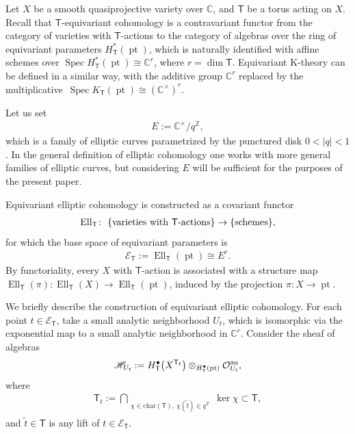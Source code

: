 \documentclass[pdftex]{sigma}
\DeclareMathOperator\pt{pt}
\def\Z{{\mathbb Z}}
\def\C{{\mathbb C}}
\newcommand{\bT}{\mathsf{T}}
\def\Oc{{\mathcal O}}
\newcommand{\sE}{\mathscr{E}}
\newcommand{\cE}{\mathscr{E}}
\newcommand{\Spec}{\operatorname{Spec}}
\newcommand{\Ell}{\operatorname{Ell}}
\numberwithin{equation}{section}
\begin{document}
Let $X$ be a smooth quasiprojective variety over $\C$, and $\bT$ be a torus acting on $X$. Recall that $\bT$-equivariant cohomology is a contravariant functor from the category of varieties with $\bT$-actions to the category of algebras over the ring of equivariant parameters $H^*_\bT (\pt)$, which is naturally identified with affine schemes over $\Spec H^*_\bT (\pt) \cong \C^r$, where $r = \dim \bT$. Equivariant K-theory can be defined in a similar way, with the additive group $\C^r$ replaced by the multiplicative~$\Spec K_\bT (\pt) \cong (\C^{\times})^r$.

Let us set
\begin{gather*}
E := \C^{\times} / q^{\Z},
\end{gather*}
which is a family of elliptic curves parametrized by the punctured disk $0<|q|<1$. In the general definition of elliptic cohomology one works with more general families of elliptic curves, but considering $E$ will be sufficient for the purposes of the present paper.

Equivariant elliptic cohomology is constructed as a covariant functor
\begin{gather*}
\Ell_\bT\colon \ \{ \text{varieties with $\bT$-actions} \} \rightarrow \{ {\rm schemes}\},
\end{gather*}
for which the base space of equivariant parameters is
\begin{gather*}
\sE_\bT := \Ell_\bT (\pt) \cong E^r.
\end{gather*}
By functoriality, every $X$ with $\bT$-action is associated with a structure map $ \Ell_\bT(\pi)\colon \Ell_\bT (X) \to \Ell_\bT(\pt)$, induced by the projection $\pi\colon X \to \pt$.

We briefly describe the construction of equivariant elliptic cohomology. For each point $t\in \sE_\bT$, take a small analytic neighborhood $U_t$, which is isomorphic via the exponential map to a small analytic neighborhood in $\C^r$. Consider the sheaf of algebras
\begin{gather*}
\mathscr{H}_{U_t} := H^\bullet_\bT \big(X^{\bT_t}\big) \otimes_{H^\bullet_\bT (\pt)} \Oc^{{\rm an}}_{U_t},
\end{gather*}
where
\begin{gather*}
\bT_t := \bigcap_{\substack{\chi \in \mathrm{char} (\bT),\, \chi(\tilde t) \in q^{\Z} }} \ker \chi \subset \bT,
\end{gather*}
and $\tilde t \in \bT$ is any lift of $t \in \cE_\bT$.
\end{document}
